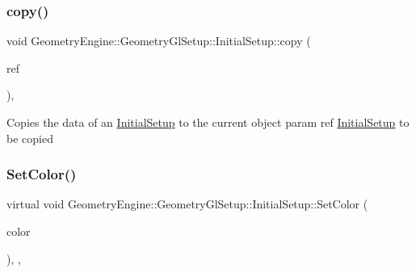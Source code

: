 \mbox{\label{class_geometry_engine_1_1_geometry_gl_setup_1_1_initial_setup_a2140bf33e9792369fc60853c58fdc789}} 
\subsubsection{\texorpdfstring{copy()}{copy()}}
{\footnotesize\ttfamily void Geometry\+Engine\+::\+Geometry\+Gl\+Setup\+::\+Initial\+Setup\+::copy (\begin{DoxyParamCaption}\item[{const \mbox{\hyperlink{class_geometry_engine_1_1_geometry_gl_setup_1_1_initial_setup}{Initial\+Setup}} \&}]{ref }\end{DoxyParamCaption})\hspace{0.3cm}{\ttfamily [protected]}, {\ttfamily [virtual]}}

Copies the data of an \mbox{\hyperlink{class_geometry_engine_1_1_geometry_gl_setup_1_1_initial_setup}{Initial\+Setup}} to the current object param ref \mbox{\hyperlink{class_geometry_engine_1_1_geometry_gl_setup_1_1_initial_setup}{Initial\+Setup}} to be copied \mbox{\label{class_geometry_engine_1_1_geometry_gl_setup_1_1_initial_setup_a403192af4493ada23671bf1d95f2da89}} 
\subsubsection{\texorpdfstring{SetColor()}{SetColor()}}
{\footnotesize\ttfamily virtual void Geometry\+Engine\+::\+Geometry\+Gl\+Setup\+::\+Initial\+Setup\+::\+Set\+Color (\begin{DoxyParamCaption}\item[{const Q\+Vector4D \&}]{color }\end{DoxyParamCaption})\hspace{0.3cm}{\ttfamily [inline]}, {\ttfamily [override]}, {\ttfamily [virtual]}}

